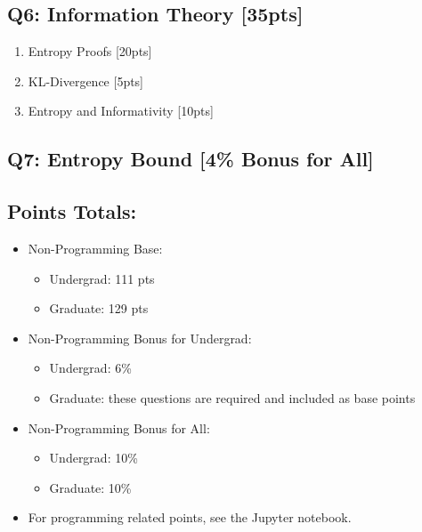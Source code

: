 \subsection*{Q6: Information Theory [35pts]}
\begin{enumerate}[label=\arabic*.]
    \itemsep0em
    \item Entropy Proofs [20pts]
    \item KL-Divergence [5pts]
    \item Entropy and Informativity [10pts]
\end{enumerate}

\subsection*{Q7: Entropy Bound [4\% Bonus for All]}

\bigskip
\subsection*{Points Totals:}
\begin{itemize}
    \item Non-Programming Base:\begin{itemize}
        \itemsep0em
        \item Undergrad: 111 pts
        \item Graduate: 129 pts
    \end{itemize}
    \item Non-Programming Bonus for Undergrad:\begin{itemize}
        \itemsep0em
        \item Undergrad: 6\%
        \item Graduate: these questions are required and included as base points
    \end{itemize}
    \item Non-Programming Bonus for All:\begin{itemize}
        \itemsep0em
        \item Undergrad: 10\%
        \item Graduate: 10\%
    \end{itemize}
    \item For programming related points, see the Jupyter notebook.
\end{itemize}